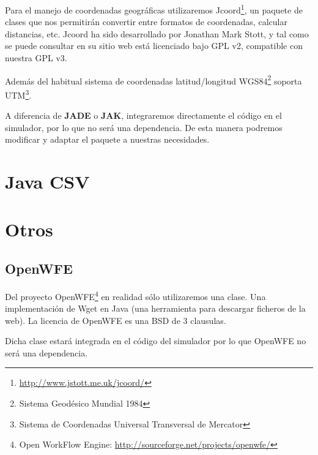 Para el manejo de coordenadas geográficas utilizaremos
Jcoord\footnote{\url{http://www.jstott.me.uk/jcoord/}}, un paquete de clases que
nos permitirán convertir entre formatos de coordenadas, calcular distancias,
etc. Jcoord ha sido desarrollado por Jonathan Mark Stott, y tal como se puede
consultar en su sitio web está licenciado bajo GPL v2, compatible con nuestra
GPL v3. %

Además del habitual sistema de coordenadas latitud/longitud
WGS84\footnote{Sistema Geodésico Mundial 1984} soporta UTM\footnote{Sistema de
Coordenadas Universal Transversal de Mercator}.

A diferencia de {\bf JADE} o {\bf JAK}, integraremos directamente el código en
el simulador, por lo que no será una dependencia. De esta manera podremos
modificar y adaptar el paquete a nuestras necesidades.

\section*{Java CSV}

\section*{Otros}


\subsection*{OpenWFE}

Del proyecto OpenWFE\footnote{Open WorkFlow Engine:
\url{http://sourceforge.net/projects/openwfe/}} en realidad sólo utilizaremos
una clase. Una implementación de Wget en Java (una herramienta para descargar
ficheros de la web). La licencia de OpenWFE es una BSD de 3 clausulas.

Dicha clase estará integrada en el código del simulador por lo que OpenWFE no
será una dependencia.